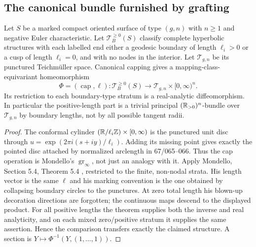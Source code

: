 \subsection{The canonical bundle furnished by grafting}
\begin{theorem}\label{A4-grafting}
Let $S$ be a marked compact oriented surface of type $(g,n)$ with $n\geq1$ and negative Euler characteristic. Let $\mathcal T_B^{\geq0}(S)$ classify complete hyperbolic structures with each labelled end either a geodesic boundary of length $\ell_i>0$ or a cusp of length $\ell_i=0$, and with no nodes in the interior. Let $\mathcal T_{g,n}$ be its punctured Teichm\"uller space. Canonical capping gives a mapping-class-equivariant homeomorphism
\[
\Phi=(\operatorname{cap},\ell):\mathcal T_B^{\geq0}(S)
\longrightarrow\mathcal T_{g,n}\times[0,\infty)^n.
\]
Its restriction to each boundary-type stratum is a real-analytic diffeomorphism. In particular the positive-length part is a trivial principal $({\mathbb{R}}_{>0})^n$-bundle over $\mathcal T_{g,n}$ by boundary lengths, not by all possible tangent radii.
\end{theorem}
\begin{proof}
The conformal cylinder $({\mathbb{R}}/\ell_i{\mathbb{Z}})\times[0,\infty)$ is the punctured unit disc through $u=\exp(2\pi i(s+iy)/\ell_i)$. Adding its missing point gives exactly the pointed disc attached by normalized arclength in 67/065--066. Thus the cap operation is Mondello's $\operatorname{gr}_\infty$, not just an analogy with it. Apply Mondello, Section 5.4, Theorem 5.4 \cite{AMondello2011}, restricted to the finite, non-nodal strata. His length vector is the same $\ell$ and his marking convention is the one obtained by collapsing boundary circles to the punctures. At zero total length his blown-up decoration directions are forgotten; the continuous maps descend to the displayed product. For all positive lengths the theorem supplies both the inverse and real analyticity, and on each mixed zero/positive stratum it supplies the same assertion. Hence the comparison transfers exactly the claimed structure. A section is $Y\mapsto\Phi^{-1}(Y,(1,\ldots,1))$.
\end{proof}

